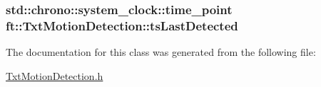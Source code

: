 \subsubsection[{\texorpdfstring{ts\+Last\+Detected}{tsLastDetected}}]{\setlength{\rightskip}{0pt plus 5cm}std\+::chrono\+::system\+\_\+clock\+::time\+\_\+point ft\+::\+Txt\+Motion\+Detection\+::ts\+Last\+Detected\hspace{0.3cm}{\ttfamily [protected]}}\hypertarget{classft_1_1_txt_motion_detection_a5df0ee20308db61c230e17582f3e56bf}{}\label{classft_1_1_txt_motion_detection_a5df0ee20308db61c230e17582f3e56bf}


The documentation for this class was generated from the following file\+:\begin{DoxyCompactItemize}
\item 
\hyperlink{_txt_motion_detection_8h}{Txt\+Motion\+Detection.\+h}\end{DoxyCompactItemize}
